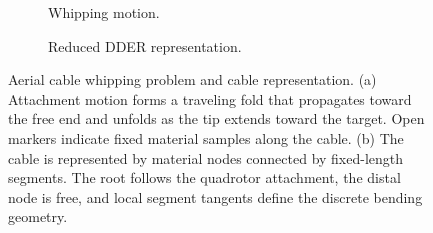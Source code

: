 % 

\begin{figure}[t]
  \centering
  \begin{subfigure}[t]{0.495\textwidth}
    \centering
    \resizebox{\linewidth}{!}{%
    }
    \caption{Whipping motion.}
    \label{fig:problem_whipping}
  \end{subfigure}
  \hfill
  \begin{subfigure}[t]{0.495\textwidth}
    \centering
    \resizebox{\linewidth}{!}{%
    }
    \caption{Reduced DDER representation.}
    \label{fig:problem_dder}
  \end{subfigure}

  \caption{Aerial cable whipping problem and cable representation. (a) Attachment motion forms a traveling fold that propagates toward the free end and unfolds as the tip extends toward the target. Open markers indicate fixed material samples along the cable. (b) The cable is represented by material nodes connected by fixed-length segments. The root follows the quadrotor attachment, the distal node is free, and local segment tangents define the discrete bending geometry.}
  \label{fig:problem_statement}
\end{figure}
